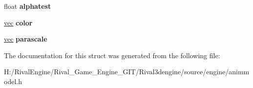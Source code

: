\begin{DoxyCompactItemize}
\item 
\mbox{\label{structanimmodel_1_1shaderparams_aa0dbd304653450c2573a1056592cf9d7}} 
float {\bfseries alphatest}
\item 
\mbox{\label{structanimmodel_1_1shaderparams_ac01097fc9c174672de11b23ac01a5798}} 
\hyperlink{structvec}{vec} {\bfseries color}
\item 
\mbox{\label{structanimmodel_1_1shaderparams_a5d38edd2c0313f4d63c30a777c615bea}} 
\hyperlink{structvec}{vec} {\bfseries parascale}
\end{DoxyCompactItemize}


The documentation for this struct was generated from the following file\+:\begin{DoxyCompactItemize}
\item 
H\+:/\+Rival\+Engine/\+Rival\+\_\+\+Game\+\_\+\+Engine\+\_\+\+G\+I\+T/\+Rival3dengine/source/engine/animmodel.\+h\end{DoxyCompactItemize}
